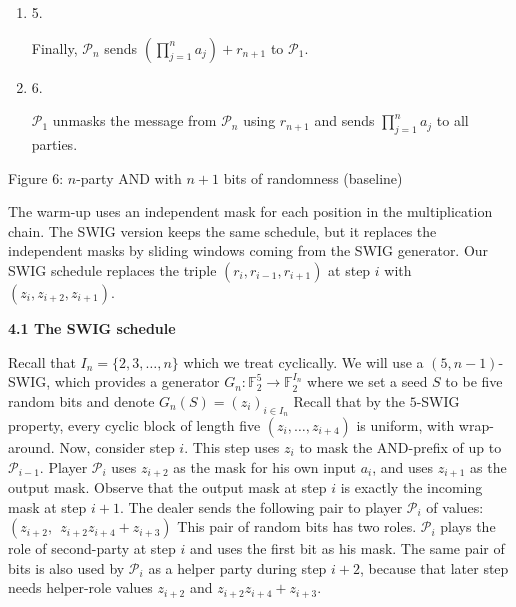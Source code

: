 \begin{enumerate}
\item[] 
5. 


Finally, $\mathcal{P}_{n}$ sends $(\prod_{j=1}^{n}a_{j})+r_{n+1}$ to $\mathcal{P}_{1}$.\par





\item[] 
6. 


$\mathcal{P}_{1}$ unmasks the message from $\mathcal{P}_{n}$ using $r_{n+1}$ and sends $\prod_{j=1}^{n}a_{j}$ to all parties.\par





\end{enumerate}


Figure 6: $n$-party AND with $n+1$ bits of randomness (baseline)



The warm-up uses an independent mask for each position in the multiplication chain. The SWIG version keeps the same schedule, but it replaces the independent masks by sliding windows coming from the SWIG generator. Our SWIG schedule replaces the triple $(r_{i},r_{i-1},r_{i+1})$ at step $i$ with $(z_{i},z_{i+2},z_{i+1})$.\par




\par\medskip\noindent\textbf{
4.1 The SWIG schedule}\par




Recall that $I_{n}=\{2,3,\dots,n\}$ which we treat cyclically. We will use
a $(5,n-1)$-SWIG, which provides a generator
$G_{n}:\mathbb{F}_{2}^{5}\to\mathbb{F}_{2}^{I_{n}}$
where we set a seed $S$ to be five random bits and denote
$G_{n}(S)=(z_{i})_{i\in I_{n}}$
Recall that by the $5$-SWIG property, every cyclic block of length five
$(z_{i},\ldots,z_{i+4})$ is uniform, with wrap-around. Now, consider step $i$. This step uses $z_{i}$ to mask the AND-prefix of up to $\mathcal{P}_{i-1}$. Player $\mathcal{P}_{i}$ uses $z_{i+2}$ as the mask for his own input $a_{i}$, and uses $z_{i+1}$ as the output mask. Observe that the output mask at step $i$ is exactly the incoming mask at step $i+1$. The dealer sends the following pair to player $\mathcal{P}_{i}$ of values:
$(z_{i+2},\ \ z_{i+2}z_{i+4}+z_{i+3})$
This pair of random bits has two roles. $\mathcal{P}_{i}$ plays the role of second-party at step $i$ and uses the first bit as his mask. The same pair of bits is also used by $\mathcal{P}_{i}$ as a helper party during step $i+2$, because that later step needs helper-role values
$z_{i+2}$ and
$z_{i+2}z_{i+4}+z_{i+3}$.\par




